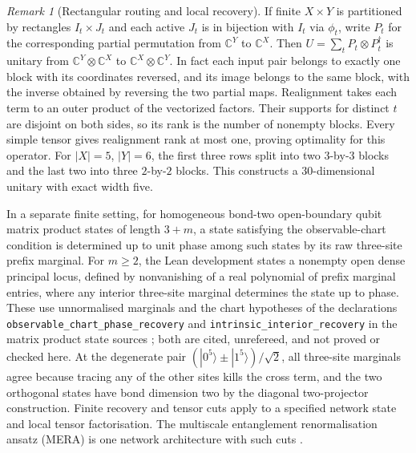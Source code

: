 \documentclass[aps,pra,onecolumn,superscriptaddress,nofootinbib,10pt]{revtex4-2}
\theoremstyle{definition}
\theoremstyle{remark}
\newtheorem{remark}[theorem]{Remark}
\begin{document}
\begin{remark}[Rectangular routing and local recovery]\label{ub:othernets}
If finite $X\times Y$ is partitioned by rectangles $I_t\times J_t$
and each active $J_t$ is in bijection with $I_t$ via $\phi_t$,
write $P_t$ for the corresponding partial permutation from
$\mathbb C^Y$ to $\mathbb C^X$. Then $U=\sum_tP_t\otimes P_t^\dagger$
is unitary from $\mathbb C^Y\otimes\mathbb C^X$ to
$\mathbb C^X\otimes\mathbb C^Y$. In fact each input pair belongs to
exactly one block with its coordinates reversed, and its image belongs
to the same block, with the inverse obtained by reversing the two
partial maps. Realignment takes each term to an outer product of the
vectorized factors. Their supports for distinct $t$ are disjoint
on both sides, so its rank is the number of nonempty blocks.
Every simple tensor gives realignment rank at most one, proving
optimality for this operator. For $|X|=5$, $|Y|=6$, the first three
rows split into two $3$-by-$3$ blocks and the last two into three
$2$-by-$2$ blocks. This constructs a $30$-dimensional unitary
with exact width five.

In a separate finite setting, for homogeneous bond-two
open-boundary qubit matrix product states of length $3+m$, a state
satisfying the observable-chart condition is determined up to unit
phase among such states by its raw three-site prefix marginal.
For $m\ge2$, the Lean development states a nonempty open
dense principal locus, defined by nonvanishing of a real polynomial
of prefix marginal entries, where any interior three-site marginal
determines the state up to phase. These use unnormalised marginals and
the chart hypotheses of the declarations
\texttt{observable\_chart\_phase\_recovery} and
\texttt{intrinsic\_interior\_recovery} in the matrix product state
sources \cite{ub:lean}; both are cited, unrefereed, and not proved or checked here. At the degenerate
pair $(|0^5\rangle\pm|1^5\rangle)/\sqrt2$, all three-site marginals
agree because tracing any of the other sites kills the cross term,
and the two orthogonal states have bond dimension two by the diagonal
two-projector construction. Finite recovery and tensor cuts apply to
a specified network state and local tensor factorisation.
The multiscale entanglement renormalisation ansatz (MERA)
is one network architecture with such cuts
\cite{ub:vidal,ub:cui}.
\end{remark}
\end{document}
